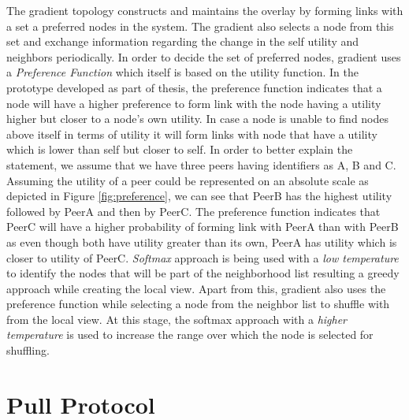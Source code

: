 \documentclass[a4paper,11pt]{kth-mag}
\begin{document}
\par The gradient topology constructs and maintains the overlay by forming links with a set a preferred nodes in the system. The gradient also selects a node from this set and exchange information regarding the change in the self utility and neighbors periodically. In order to decide the set of preferred nodes, gradient uses a \textit{Preference Function} which itself is based on the utility function. In the prototype developed as part of thesis, the preference function indicates that a node will have a higher preference to form link with the node having a utility higher but closer to a node's own utility. In case a node is unable to find nodes above itself in terms of utility it will form links with node that have a utility which is lower than self but closer to self. In order to better explain the statement, we assume that we have three peers having identifiers as A, B and C. Assuming the utility of a peer could be represented on an absolute scale as depicted in Figure \ref{fig:preference}, we can see that PeerB has the highest utility  followed by PeerA and then by PeerC. The preference function indicates that PeerC will have a higher probability of forming link with PeerA than with PeerB as even though both have utility greater than its own, PeerA has utility which is closer to utility of PeerC. \textit{Softmax} approach is being used with a \textit{low temperature} to identify the nodes that will be part of the neighborhood list resulting a greedy approach while creating the local view. Apart from this, gradient also uses the  preference function while selecting a node from the neighbor list to shuffle with from the local view. At this stage, the softmax approach with a \textit{higher temperature} is used to increase the range over which the node is selected for shuffling.


\section{Pull Protocol}
\end{document}
